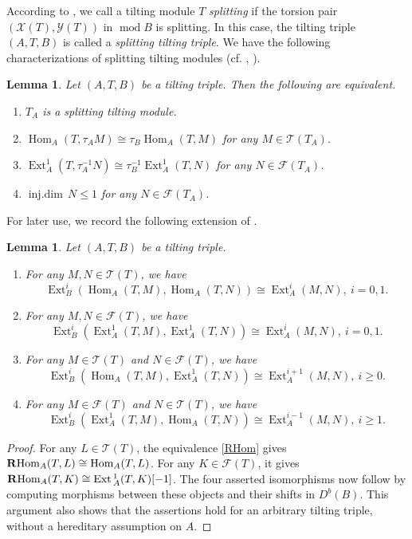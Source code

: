 \documentclass[reqno,12pt]{amsart}
\numberwithin{equation}{section}
\def\Ext{\mbox{\rm Ext}\,} \def\Hom{\mbox{\rm Hom}} \def\dim{\mbox{\rm dim}} \def\Iso{\mbox{\rm Iso}\,}
\theoremstyle{plain}
\newtheorem{lemma}[theorem]{\bf Lemma}
\theoremstyle{definition}
\begin{document}
According to \cite[VI Definition 5.1]{ASS}, we call a tilting module $T$ {\em splitting} if the torsion pair $(\mathcal{X}(T),\mathcal{Y}(T))$ in $\operatorname{mod} B$ is splitting.
In this case, the tilting triple \( (A, T, B) \) is called a {\em splitting tilting triple}.
We have the following characterizations of splitting tilting modules (cf. \cite[Lemma 2.10]{CHE}, \cite{HOS}).
\begin{lemma}\label{splitting}
Let \( (A, T, B) \) be a tilting triple. Then the following are equivalent.
\begin{enumerate}
\item[(1)] \( T_A \) is a splitting tilting module.
\item[(2)] \( \operatorname{Hom}_A(T, \tau_A M) \cong \tau_B \operatorname{Hom}_A(T, M) \) for any \( M \in \mathcal{T}(T_A) \).
\item[(3)] \( \operatorname{Ext}_A^1(T, \tau_A^{-1} N) \cong \tau_B^{-1} \operatorname{Ext}_A^1(T, N) \) for any \( N \in \mathcal{F}(T_A) \).
\item[(4)] \( \operatorname{inj.dim}\, N \leq 1 \) for any \( N \in \mathcal{F}(T_A) \).
\end{enumerate}
\end{lemma}
For later use, we record the following extension of
\cite[Lemmas 1.3--1.6]{PENG}.
\begin{lemma}\label{xt}
Let \( (A, T, B) \) be a tilting triple.
\begin{enumerate}
\item[(1)] For any $M , N \in \mathcal{T} (T)$, we have
\[\operatorname{Ext}_B^i(\operatorname{Hom}_A ( T , M ) , \operatorname{Hom}_A ( T , N )) \cong \operatorname{Ext}_A^i (M ,N),~i=0,1.\]
\item[(2)] For any $M , N \in \mathcal{F} (T)$, we have
\[\operatorname{Ext}_B^i(\operatorname{Ext}_A^1 ( T , M ), \operatorname{Ext}_A^1 ( T , N )) \cong \operatorname{Ext}_A^i (M ,N),~i=0,1.\]
\item[(3)] For any $M \in \mathcal{T} (T)$ and $N \in \mathcal{F} (T)$, we have
\[\operatorname{Ext}_B^i(\operatorname{Hom}_A ( T , M ), \operatorname{Ext}_A^1 ( T, N )) \cong \operatorname{Ext}_A^{i+1} (M ,N),~i \ge 0.\]
\item[(4)] For any $M \in \mathcal{F} (T)$ and $N \in \mathcal{T} (T)$, we have
\[\operatorname{Ext}_B^i(\operatorname{Ext}_A^1 ( T , M ) , \operatorname{Hom}_A ( T , N )) \cong \operatorname{Ext}_A^{i-1} (M ,N),~i \ge 1.\]
\end{enumerate}
\end{lemma}
\begin{proof}
For any $L\in\mathcal{T}(T)$, the equivalence \eqref{RHom} gives
\(\mathbf{R}\Hom_A(T,L)\cong\Hom_A(T,L)\). For any
$K\in\mathcal{F}(T)$, it gives
\(\mathbf{R}\Hom_A(T,K)\cong\Ext_A^1(T,K)[-1]\).
The four asserted isomorphisms now follow by computing morphisms between these objects and their shifts in $D^b(B)$. This argument also shows that the assertions hold for an arbitrary tilting triple, without a hereditary assumption on $A$.
\end{proof}
\end{document}
